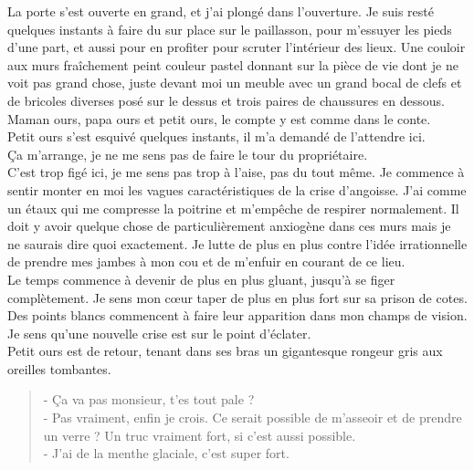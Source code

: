 La porte s'est ouverte en grand, et j'ai plongé dans l'ouverture. Je suis resté quelques instants à faire du sur place sur le paillasson, pour m'essuyer les pieds d'une part, et aussi pour en profiter pour scruter l'intérieur des lieux. Une couloir aux murs fraîchement peint couleur pastel donnant sur la pièce de vie dont je ne voit pas grand chose, juste devant moi un meuble avec un grand bocal de clefs et de bricoles diverses posé sur le dessus et trois paires de chaussures en dessous. \\
Maman ours, papa ours et petit ours, le compte y est comme dans le conte. \\

Petit ours s'est esquivé quelques instants, il m'a demandé de l'attendre ici. \\
Ça m'arrange, je ne me sens pas de faire le tour du propriétaire. \\
C'est trop figé ici, je me sens pas trop à l'aise, pas du tout même. Je commence à sentir monter en moi les vagues caractéristiques de la crise d'angoisse. J'ai comme un étaux qui me compresse la poitrine et m'empêche de respirer normalement. Il doit y avoir quelque chose de particulièrement anxiogène dans ces murs mais je ne saurais dire quoi exactement. Je lutte de plus en plus contre l'idée irrationnelle de prendre mes jambes à mon cou et de m'enfuir en courant de ce lieu. \\
Le temps commence à devenir de plus en plus gluant, jusqu'à se figer complètement. Je sens mon cœur taper de plus en plus fort sur sa prison de cotes. Des points blancs commencent à faire leur apparition dans mon champs de vision.\\

Je sens qu'une nouvelle crise est sur le point d'éclater. \\

Petit ours est de retour, tenant dans ses bras un gigantesque rongeur gris aux oreilles tombantes. \\

\begin{quote}
- Ça va pas monsieur, t'es tout pale ? \\
- Pas vraiment, enfin je crois. Ce serait possible de m’asseoir et de prendre un verre ? Un truc vraiment fort, si c'est aussi possible. \\
- J'ai de la menthe glaciale, c'est super fort. \\
\end{quote}

